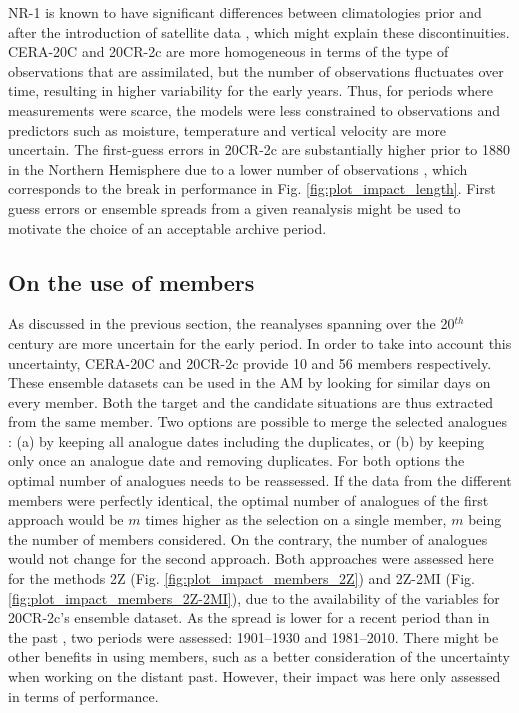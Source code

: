 \documentclass{ametsoc}
\begin{document}
NR-1 is known to have significant differences between climatologies prior and after the introduction of satellite data \citep{Kistler2001}, which might explain these discontinuities. CERA-20C and 20CR-2c are more homogeneous in terms of the type of observations that are assimilated, but the number of observations fluctuates over time, resulting in higher variability for the early years. Thus, for periods where measurements were scarce, the models were less constrained to observations and predictors such as moisture, temperature and vertical velocity are more uncertain. The first-guess errors in 20CR-2c are substantially higher prior to 1880 in the Northern Hemisphere due to a lower number of observations \citep{Compo2011}, which corresponds to the break in performance in Fig. \ref{fig:plot_impact_length}. First guess errors or ensemble spreads from a given reanalysis might be used to motivate the choice of an acceptable archive period.


\subsection{On the use of members}
\label{sec:ensemble}

As discussed in the previous section, the reanalyses spanning over the 20$^{th}$ century are more uncertain for the early period. In order to take into account this uncertainty, CERA-20C and 20CR-2c provide 10 and 56 members respectively. These ensemble datasets can be used in the AM by looking for similar days on every member. Both the target and the candidate situations are thus extracted from the same member. Two options are possible to merge the selected analogues : (a) by keeping all analogue dates including the duplicates, or (b) by keeping only once an analogue date and removing duplicates. For both options the optimal number of analogues needs to be reassessed. If the data from the different members were perfectly identical, the optimal number of analogues of the first approach would be $m$ times higher as the selection on a single member, $m$ being the number of members considered. On the contrary, the number of analogues would not change for the second approach. Both approaches were assessed here for the methods 2Z (Fig. \ref{fig:plot_impact_members_2Z}) and 2Z-2MI (Fig. \ref{fig:plot_impact_members_2Z-2MI}), due to the availability of the variables for 20CR-2c's ensemble dataset. As the spread is lower for a recent period than in the past \citep{Compo2011}, two periods were assessed: 1901--1930 and 1981--2010. There might be other benefits in using members, such as a better consideration of the uncertainty when working on the distant past. However, their impact was here only assessed in terms of performance.
\end{document}
